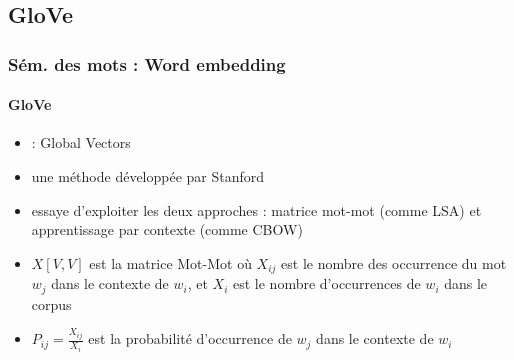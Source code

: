 \documentclass[xcolor=table]{beamer}
\begin{document}
\subsection{GloVe}

\begin{frame}
\frametitle{Sém. des mots : Word embedding}
\framesubtitle{GloVe}

\begin{itemize}
	\item {} : Global Vectors
	\item une méthode développée par Stanford \cite{2014-pennington-al}
	\item essaye d'exploiter les deux approches : matrice mot-mot (comme LSA) et apprentissage par contexte (comme CBOW)
	\item $X[V, V]$ est la matrice Mot-Mot où $X_{ij}$ est le nombre des occurrence du mot $w_j$ dans le contexte de $w_i$, et $X_i$ est le nombre d'occurrences de $w_i$ dans le corpus
	\item $P_{ij} = \frac{X_{ij}}{X_i}$ est la probabilité d'occurrence de $w_j$ dans le contexte de $w_i$
\end{itemize}


\end{frame}
\end{document}
